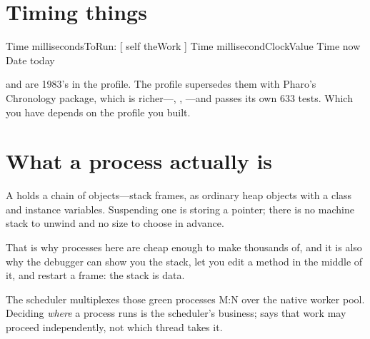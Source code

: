 \section{Timing things}

\begin{st}
Time millisecondsToRun: [ self theWork ]
Time millisecondClockValue
Time now
Date today
\end{st}

\begin{stwarn}
 and  are 1983's in the  profile. The
 profile supersedes them with Pharo's Chronology package,
which is richer---, , ---and
passes its own 633 tests. Which you have depends on the profile you built.
\end{stwarn}

\section{What a process actually is}

A  holds a chain of  objects---stack frames, as
ordinary heap objects with a class and instance variables. Suspending one is
storing a pointer; there is no machine stack to unwind and no size to choose
in advance.

That is why processes here are cheap enough to make thousands of, and it is
also why the debugger can show you the stack, let you edit a method in the
middle of it, and restart a frame: the stack is data.

The scheduler multiplexes those green processes M:N over the native worker
pool. Deciding \emph{where} a process runs is the scheduler's business;
 says that work may proceed independently, not which thread
takes it.
